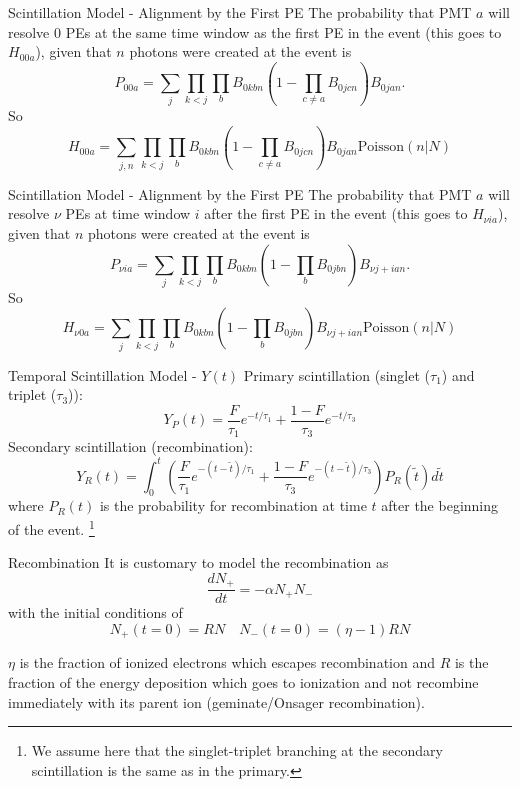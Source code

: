 \documentclass{beamer}
\newcommand\blfootnote[1]{%
  \begingroup
  \renewcommand\thefootnote{}\footnote{#1}%
  \addtocounter{footnote}{-1}%
  \endgroup
}
\begin{document}
\begin{frame}{Scintillation Model - Alignment by the First PE}
The probability that PMT $a$ will resolve $0$ PEs at the same time window as the first PE in the event (this goes to $H_{00a}$), given that $n$ photons were created at the event is
\begin{equation}
P_{00a}=\sum_j\prod_{k<j}\prod_bB_{0kbn}(1-\prod_{c\neq a}B_{0jcn})B_{0jan}.
\end{equation}
So
\begin{equation}
H_{00a}=\sum_{j,n}\prod_{k<j}\prod_bB_{0kbn}(1-\prod_{c\neq a}B_{0jcn})B_{0jan}\text{Poisson}(n|N)
\end{equation}
\end{frame}


\begin{frame}{Scintillation Model - Alignment by the First PE}
The probability that PMT $a$ will resolve $\nu$ PEs at time window $i$ after the first PE in the event (this goes to $H_{\nu ia}$), given that $n$ photons were created at the event is
\begin{equation}
P_{\nu ia}=\sum_j\prod_{k<j}\prod_bB_{0kbn}(1-\prod_bB_{0jbn})B_{\nu j+ian}.
\end{equation}
So
\begin{equation}
H_{\nu0a}=\sum_j\prod_{k<j}\prod_bB_{0kbn}(1-\prod_bB_{0jbn})B_{\nu j+ian}\text{Poisson}(n|N)
\end{equation}
\end{frame}

\begin{frame}{Temporal Scintillation Model - $Y(t)$}
Primary scintillation (singlet ($\tau_1$) and triplet ($\tau_3$)):
\begin{equation}
Y_P(t)=\frac{F}{\tau_1}e^{-t/\tau_1}+\frac{1-F}{\tau_3}e^{-t/\tau_3}
\end{equation}
Secondary scintillation (recombination):
\begin{equation}
Y_R(t)=\int_0^t\left(\frac{F}{\tau_1}e^{-(t-\tilde{t})/\tau_1}+\frac{1-F}{\tau_3}e^{-(t-\tilde{t})/\tau_3}\right)P_R(\tilde{t})d\tilde{t}
\end{equation}
where $P_R(t)$ is the probability for recombination at time $t$ after the beginning of the event.
\blfootnote{We assume here that the singlet-triplet branching at the secondary scintillation is the same as in the primary.}
\end{frame}

\begin{frame}{Recombination}
It is customary to model the recombination as
\begin{equation}
\frac{dN_+}{dt}=-\alpha N_+N_-
\end{equation}
with the initial conditions of
\begin{equation}
N_+(t=0)=RN \quad N_-(t=0)=(\eta-1)RN
\end{equation}

$\eta$ is the fraction of ionized electrons which escapes recombination and $R$ is the fraction of the energy deposition which goes to ionization and not recombine immediately with its parent ion (geminate/Onsager recombination).  
\end{frame}
\end{document}
